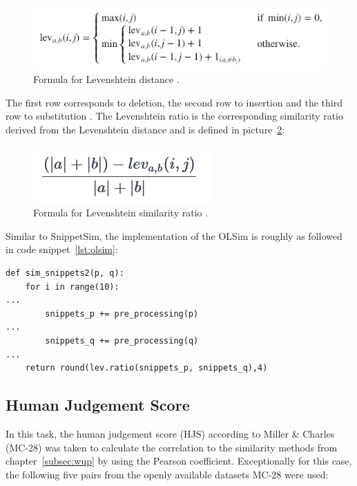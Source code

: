 \documentclass[conference]{IEEEtran}
\begin{document}
\begin{figure}[h]
\centerline{\includegraphics[scale=0.6]{img/lev.png}}
\caption{Formula for Levenshtein distance \cite{fuzzy}.}
\label{fig:lev}
\end{figure}

The first row corresponds to deletion, the second row to insertion and the third row to substitution \cite{fuzzy}. The Levenshtein ratio is the corresponding similarity ratio derived from the Levenshtein distance \cite{fuzzy} and is defined in picture~\ref{fig:levratio}:

\begin{figure}[h]
\centerline{\includegraphics[scale=0.6]{img/levratio.png}}
\caption{Formula for Levenshtein similarity ratio \cite{fuzzy}.}
\label{fig:levratio}
\end{figure}

Similar to SnippetSim, the implementation of the OLSim is roughly as followed in code snippet~\ref{lst:olsim}:

\begin{lstlisting}[frame=single, label=lst:olsim, caption={Calculation of OLSim}, captionpos=b]
def sim_snippets2(p, q):
    for i in range(10):
...
        snippets_p += pre_processing(p)
...
        snippets_q += pre_processing(q)   
...
    return round(lev.ratio(snippets_p, snippets_q),4)
\end{lstlisting}

\subsection{Human Judgement Score}\label{subsec:humanjudge}

In this task, the human judgement score (HJS) according to Miller \& Charles (MC-28)  \cite{miller} was taken to calculate the correlation to the similarity methods from chapter~\ref{subsec:wup} by using the Pearson coefficient. Exceptionally for this case, the following five pairs from the openly available datasets MC-28 \cite{miller} were used:
\end{document}
